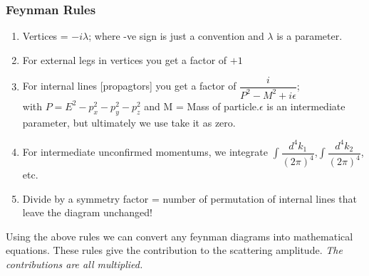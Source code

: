 \documentclass[a4paper]{article}
\begin{document}
\subsubsection{Feynman Rules}
\begin{enumerate}
    \item Vertices = $-i\lambda$; where -ve sign is just a convention and $\lambda$ is a parameter. 
    \item For external legs in vertices you get a factor of $+1$
    \item For internal lines [propagtors] you get a factor of $\dfrac{i}{P^2 - M^2 + i\epsilon}$; \\with $P = E^2 - p_x^2 - p_y^2 -p_z^2$ and M = Mass of particle.$\epsilon$ is an intermediate parameter, but ultimately we use take it as zero.
    \item For intermediate unconfirmed momentums, we integrate $\int\dfrac{d^4k_1}{(2\pi)^4}$,$\int\dfrac{d^4k_2}{(2\pi)^4}$, etc.
    \item Divide by a symmetry factor = number of permutation of internal lines that leave the diagram unchanged!
\end{enumerate}
Using the above rules we can convert any feynman diagrams into mathematical equations. These rules give the contribution to the scattering amplitude.
\emph{The contributions are all multiplied.}
\end{document}
